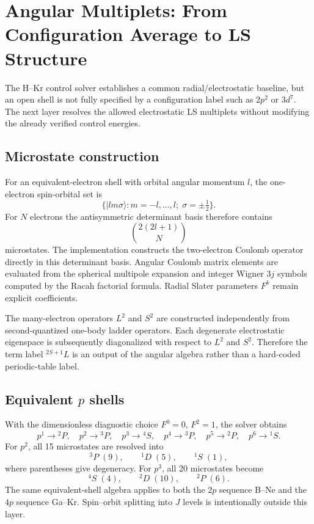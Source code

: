 \section{Angular Multiplets: From Configuration Average to LS Structure}

The H--Kr control solver establishes a common radial/electrostatic baseline, but an open shell is not fully specified by a configuration label such as $2p^2$ or $3d^7$.  The next layer resolves the allowed electrostatic LS multiplets without modifying the already verified control energies.

\subsection{Microstate construction}

For an equivalent-electron shell with orbital angular momentum $l$, the one-electron spin-orbital set is
\[
\{|l m \sigma\rangle: m=-l,\ldots,l;\;\sigma=\pm\tfrac12\}.
\]
For $N$ electrons the antisymmetric determinant basis therefore contains
\[
\binom{2(2l+1)}{N}
\]
microstates.  The implementation constructs the two-electron Coulomb operator directly in this determinant basis.  Angular Coulomb matrix elements are evaluated from the spherical multipole expansion and integer Wigner $3j$ symbols computed by the Racah factorial formula.  Radial Slater parameters $F^k$ remain explicit coefficients.

The many-electron operators $L^2$ and $S^2$ are constructed independently from second-quantized one-body ladder operators.  Each degenerate electrostatic eigenspace is subsequently diagonalized with respect to $L^2$ and $S^2$.  Therefore the term label $^{2S+1}L$ is an output of the angular algebra rather than a hard-coded periodic-table label.

\subsection{Equivalent $p$ shells}

With the dimensionless diagnostic choice $F^0=0$, $F^2=1$, the solver obtains
\[
p^1\to{}^2P,\quad
p^2\to{}^3P,\quad
p^3\to{}^4S,\quad
p^4\to{}^3P,\quad
p^5\to{}^2P,\quad
p^6\to{}^1S.
\]
For $p^2$, all 15 microstates are resolved into
\[
{}^3P\;(9),\qquad{}^1D\;(5),\qquad{}^1S\;(1),
\]
where parentheses give degeneracy.  For $p^3$, all 20 microstates become
\[
{}^4S\;(4),\qquad{}^2D\;(10),\qquad{}^2P\;(6).
\]
The same equivalent-shell algebra applies to both the $2p$ sequence B--Ne and the $4p$ sequence Ga--Kr.  Spin--orbit splitting into $J$ levels is intentionally outside this layer.

